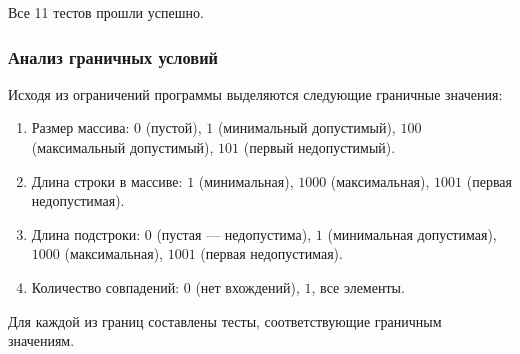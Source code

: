 \documentclass{article}[14pt]
\begin{document}
Все 11 тестов прошли успешно.

\subsubsection{Анализ граничных условий}

Исходя из ограничений программы выделяются следующие граничные значения:

\begin{enumerate}
    \item Размер массива: $0$ (пустой), $1$ (минимальный допустимый), $100$ (максимальный допустимый), $101$ (первый недопустимый).
    \item Длина строки в массиве: $1$ (минимальная), $1000$ (максимальная), $1001$ (первая недопустимая).
    \item Длина подстроки: $0$ (пустая --- недопустима), $1$ (минимальная допустимая), $1000$ (максимальная), $1001$ (первая недопустимая).
    \item Количество совпадений: $0$ (нет вхождений), $1$, все элементы.
\end{enumerate}

Для каждой из границ составлены тесты, соответствующие граничным значениям.
\end{document}
